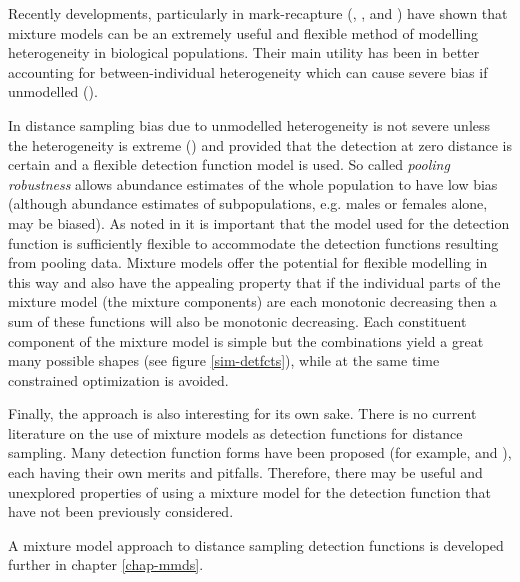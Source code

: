 Recently developments, particularly in mark-recapture (\cite{pledger2000}, \cite{dorazio03}, \cite{pledger2005} and \cite{morgan08}) have shown that mixture models can be an extremely useful and flexible method of modelling heterogeneity in biological populations. Their main utility has been in better accounting for between-individual heterogeneity which can cause severe bias if unmodelled (\cite{Link2003}). 

In distance sampling bias due to unmodelled heterogeneity is not severe unless the heterogeneity is extreme (\cite[pp. 389-392]{ADS}) and provided that the detection at zero distance is certain and a flexible detection function model is used. So called \textit{pooling robustness} allows abundance estimates of the whole population to have low bias (although abundance estimates of subpopulations, e.g. males or females alone, may be biased). As noted in  it is important that the model used for the detection function is sufficiently flexible to accommodate the detection functions resulting from pooling data. Mixture models offer the potential for flexible modelling in this way and also have the appealing property that if the individual parts of the mixture model (the mixture components) are each monotonic decreasing then a sum of these functions will also be monotonic decreasing. Each constituent component of the mixture model is simple but the combinations yield a great many possible shapes (see figure \ref{sim-detfcts}), while at the same time constrained optimization is avoided.


Finally, the approach is also interesting for its own sake. There is no current literature on the use of mixture models as detection functions for distance sampling. Many detection function forms have been proposed (for example, \cite{buckland92} and  \cite{gammadetfct}), each having their own merits and pitfalls. Therefore, there may be useful and unexplored properties of using a mixture model for the detection function that have not been previously considered.

A mixture model approach to distance sampling detection functions is developed further in chapter \ref{chap-mmds}.



